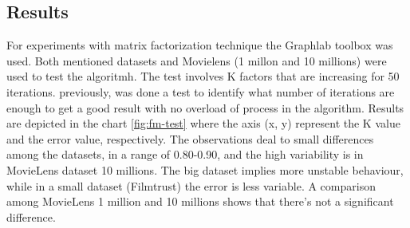 \subsection{Results} 

For experiments with matrix factorization technique the Graphlab
toolbox was used. Both mentioned datasets and Movielens (1 millon and
10 millions) were used to test the algoritmh. The test involves K
factors that are increasing for 50 iterations. previously, was done a
test to identify what number of iterations are enough to get a good
result with no overload of process in the algorithm. Results are
depicted in the chart \ref{fig:fm-test}  where the axis (x, y)
represent the K value and the error value, respectively. The
observations deal to small differences among the datasets, in a range
of 0.80-0.90, and the high variability is in MovieLens dataset 10
millions. The big dataset implies more unstable behaviour, while in a
small dataset (Filmtrust) the error is less variable. A comparison
among MovieLens 1 million and 10 millions shows that there's not a
significant difference.

